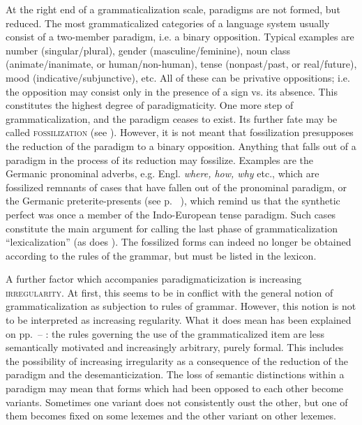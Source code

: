 At the right end of a grammaticalization scale, paradigms are not formed, but reduced. The most grammaticalized categories of a language system usually consist of a two-member paradigm, i.e. a binary opposition. Typical examples are number (singular/plural), gender (masculine/feminine), noun class (animate/inanimate, or human/non-human), tense (nonpast/past, or real/future), mood (indicative/subjunctive), etc. All of these can be privative oppositions; i.e. the opposition may consist only in the presence of a sign vs. its absence. This constitutes the highest degree of paradigmaticity. One more step of grammaticalization, and the paradigm ceases to exist. Its further fate may be called \textsc{fossilization}\label{page147} (see \citealt[35f]{HeineEtAl1984}). However, it is not meant that fossilization presupposes the reduction of the paradigm to a binary opposition. Anything that falls out of a paradigm in the process of its reduction may fossilize. Examples are the Germanic pronominal adverbs, e.g. Engl. \textit{where, how, why} etc., which are fossilized remnants of cases that have fallen out of the pronominal paradigm, or the Germanic preterite-presents (see p.~\pageref{page30}\chk%
), which remind us that the synthetic perfect was once a member of the Indo-European tense paradigm. Such cases constitute the main argument for calling the last phase of grammaticalization ``lexicalization'' (as does \citealt[209]{Givón1979b}). The fossilized forms can indeed no longer be obtained according to the rules of the grammar, but must be listed in the lexicon.

A further factor which accompanies paradigmaticization is increasing \textsc{irregularity}. At first, this seems to be in conflict with the general notion of grammaticalization as subjection to rules of grammar. However, this notion is not to be interpreted as increasing regularity. What it does mean has been explained on pp.~\pageref{page140}--\pageref{page141}\chk%
: the rules governing the use of the grammaticalized item are less semantically motivated and increasingly arbitrary, purely formal. This includes the possibility of increasing irregularity as a consequence of the reduction of the paradigm and the desemanticization. The loss of semantic distinctions within a paradigm may mean that forms which had been opposed to each other become variants. Sometimes one variant does not consistently oust the other, but one of them becomes fixed on some lexemes and the other variant on other lexemes.\enlargethispage{\baselineskip}

